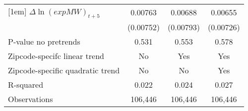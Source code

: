 {\begin{tabular}{l*{3}{c}}
[1em]
$\Delta \ln(exp MW)_{t+5}$&  0.00763         &  0.00688         &  0.00655         \\
          &(0.00752)         &(0.00793)         &(0.00726)         \\
\hline
P-value no pretrends&    0.531         &    0.553         &    0.578         \\
Zipcode-specifc linear trend&       No         &      Yes         &      Yes         \\
Zipcode-specific quadratic trend&       No         &       No         &      Yes         \\
R-squared &    0.022         &    0.024         &    0.027         \\
Observations&  106,446         &  106,446         &  106,446         \\
\hline\hline
\end{tabular}
}
